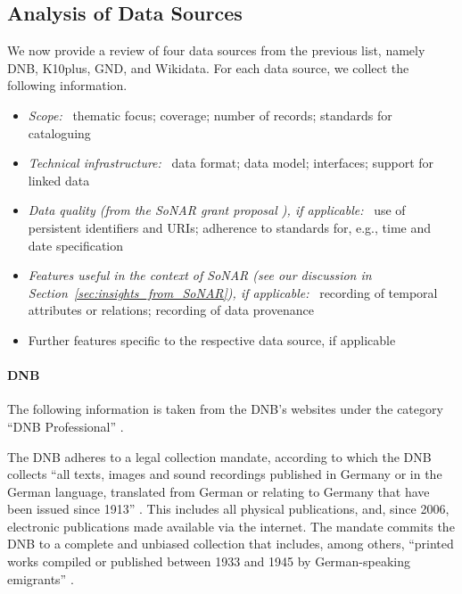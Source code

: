 \subsection{Analysis of Data Sources}
\label{subsec:analysis_data_sources}

We now provide a review of four data sources from the previous list, namely
\gls{DNB}, \gls{K10plus}, \gls{GND}, and Wikidata.
%
%
%
For each data source, we collect the following information.
%
\begin{itemize}
  \item
    \emph{Scope:}~
    thematic focus; coverage; number of records; standards for cataloguing
  \item
    \emph{Technical infrastructure:}~
    data format; data model; interfaces; support for linked data
  \item
    \emph{Data quality (from the \gls{SoNAR} grant proposal \autocite[p.\,19ff.]{SchneiderKempf2018}),
    if applicable:}~
    use of persistent identifiers and \glspl{URI}; adherence to standards for, e.g., time and date specification
  \item
    \emph{Features useful in the context of \gls{SoNAR} (see our discussion in Section~\ref{sec:insights_from_SoNAR}), if applicable:}~
    recording of temporal attributes or relations; recording of data provenance
  \item
    Further features specific to the respective data source, if applicable
\end{itemize}

\paragraph{DNB}

The following information is taken from the \gls{DNB}'s websites under the category \enquote{DNB Professional} \autocite{DNB_coll_mand,DNB_cataloguing,DNB_metadata}.

The DNB adheres to a legal collection mandate, according to which
the DNB collects \enquote{all texts, images and sound recordings published in Germany or in the German language, translated from German or relating to Germany that have been issued since 1913}  \autocite{DNB_coll_mand}. This includes all physical publications, and, since 2006, electronic publications made available via the internet. The mandate commits the DNB to a complete and unbiased collection that includes, among others, \enquote{printed works compiled or published between 1933 and 1945 by German-speaking emigrants} \autocite{DNB_coll_mand}.

